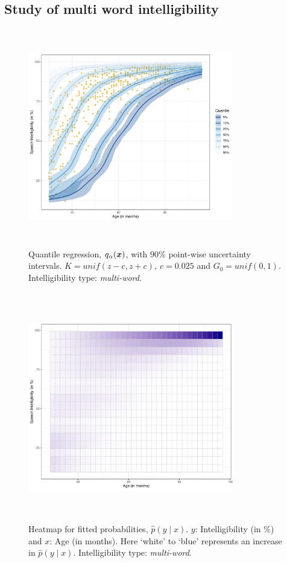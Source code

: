 \documentclass{article}[12pt]
\newcommand{\bx}{\mbox{\boldmath $x$}}
\begin{document}
\subsection{%
Study of multi word intelligibility}

\begin{figure}[H]
    \centering
    \includegraphics[width = 0.8\textwidth, height = 9.5cm]{plots/quantilesRDS3MultiWord.pdf}
    \caption{Quantile regression, $q_{\alpha}(\bx)$, with $90\%$ point-wise uncertainty intervals. $K = unif(z - c, z + c), \ c = 0.025$ and $G_0 = unif(0, 1)$. Intelligibility type: \textit{multi-word}.}
    \label{fig:4}
\end{figure}

\begin{figure}[H]
    \centering
    \includegraphics[width = 0.8\textwidth, height = 10cm]{plots/heatmapRDS3MultiWord.pdf}
    \caption{Heatmap for fitted probabilities, $\widehat p(y \mid x)$. $y$: Intelligibility (in $\%$) and $x$: Age (in months). Here `white' to `blue' represents an increase in $\widehat p(y \mid x)$. Intelligibility type: \textit{multi-word}.}
    \label{fig:5}
\end{figure}
\end{document}
